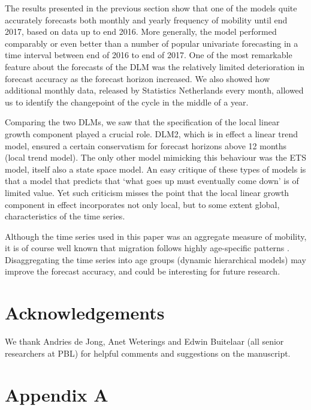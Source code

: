 \documentclass[12pt, a4paper]{article}
\begin{document}
The results presented in the previous section show that one of the models quite accurately forecasts both monthly and yearly frequency of mobility until end 2017, based on data up to end 2016. More generally, the model performed comparably or even better than a number of popular
univariate forecasting in a time interval between end of 2016 to end of
2017. One of the most remarkable feature about the forecasts of the DLM
was the relatively limited deterioration in forecast accuracy as the
forecast horizon increased. We also showed how additional monthly data, released by Statistics Netherlands every month, allowed us to identify the changepoint of the cycle in the middle of a year.

Comparing the two DLMs, we saw that the specification of the local linear growth component played a crucial role. DLM2, which is in effect a linear trend model, ensured a certain conservatism for forecast horizons above 12 months (local trend model). The only other model mimicking
this behaviour was the ETS model, itself also a state space model. An
easy critique of these types of models is that a model that predicts that `what
goes up must eventually come down' is of limited value. Yet such
criticism misses the point that the local linear growth component in
effect incorporates not only local, but to some extent global,
characteristics of the time series.

Although the time series used in this paper was an aggregate measure of mobility, it is of course well known that migration follows highly age-specific patterns \citep[see e.g., ][]{matthews2013progress, raymer2019spatial}. Disaggregating the time series into age groups (dynamic hierarchical models) may improve the forecast accuracy, and could be interesting for future research.

\section{Acknowledgements} We thank Andries de Jong, Anet Weterings and Edwin Buitelaar (all senior researchers at PBL) for helpful comments and suggestions on the manuscript. 

\renewcommand\refname{References}
\printbibliography

\section*{Appendix A}\label{appendix-a}
\end{document}
